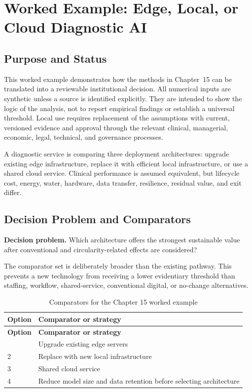 \section{Worked Example: Edge, Local, or Cloud Diagnostic AI}
\label{sec:comp-ch15-worked-example}

\subsection{Purpose and Status}
This worked example demonstrates how the methods in Chapter~15 can be
translated into a reviewable institutional decision. All numerical inputs are
synthetic unless a source is identified explicitly. They are intended to show the
logic of the analysis, not to report empirical findings or establish a universal
threshold. Local use requires replacement of the assumptions with current,
versioned evidence and approval through the relevant clinical, managerial,
economic, legal, technical, and governance processes.

A diagnostic service is comparing three deployment architectures: upgrade existing edge infrastructure, replace it with efficient local infrastructure, or use a shared cloud service. Clinical performance is assumed equivalent, but lifecycle cost, energy, water, hardware, data transfer, resilience, residual value, and exit differ. 

\subsection{Decision Problem and Comparators}
\textbf{Decision problem.} Which architecture offers the strongest sustainable value after conventional and circularity-related effects are considered?

The comparator set is deliberately broader than the existing pathway. This prevents
a new technology from receiving a lower evidentiary threshold than staffing,
workflow, shared-service, conventional digital, or no-change alternatives.

\begin{longtable}{@{}p{}p{}@{}}
\caption{Comparators for the Chapter 15 worked example}
\label{tab:comp-ch15-comparators}\\
\toprule
\textbf{Option} & \textbf{Comparator or strategy} \\
\midrule
\endfirsthead
\toprule
\textbf{Option} & \textbf{Comparator or strategy} \\
\midrule
\endhead
\bottomrule
\endlastfoot
1 & Upgrade existing edge servers \\
2 & Replace with new local infrastructure \\
3 & Shared cloud service \\
4 & Reduce model size and data retention before selecting architecture \\
\end{longtable}

